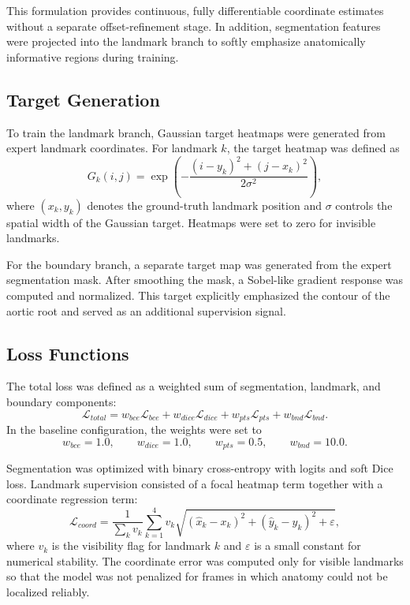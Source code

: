\documentclass[utf8]{FrontiersinHarvard}
\begin{document}
This formulation provides continuous, fully differentiable coordinate estimates without a separate offset-refinement stage. In addition, segmentation 
features were projected into the landmark branch to softly emphasize anatomically informative regions during training.

\subsection{Target Generation}

To train the landmark branch, Gaussian target heatmaps were generated from expert landmark coordinates. For landmark $k$, the target heatmap was defined as
\begin{equation}
G_k(i,j)=
\exp\left(
-\frac{(i-y_k)^2+(j-x_k)^2}{2\sigma^2}
\right),
\end{equation}
where $(x_k,y_k)$ denotes the ground-truth landmark position and $\sigma$ controls the spatial width of the Gaussian target. Heatmaps were set 
to zero for invisible landmarks.

For the boundary branch, a separate target map was generated from the expert segmentation mask. After smoothing the mask, a Sobel-like gradient 
response was computed and normalized. This target explicitly emphasized the contour of the aortic root and served as an additional supervision signal.

\subsection{Loss Functions}

The total loss was defined as a weighted sum of segmentation, landmark, and boundary components:
\begin{equation}
\mathcal{L}_{total} =
w_{bce}\mathcal{L}_{bce} +
w_{dice}\mathcal{L}_{dice} +
w_{pts}\mathcal{L}_{pts} +
w_{bnd}\mathcal{L}_{bnd}.
\end{equation}
In the baseline configuration, the weights were set to
\begin{equation}
w_{bce}=1.0,\qquad
w_{dice}=1.0,\qquad
w_{pts}=0.5,\qquad
w_{bnd}=10.0.
\end{equation}

Segmentation was optimized with binary cross-entropy with logits and soft Dice loss. Landmark supervision consisted of a focal heatmap term 
together with a coordinate regression term:
\begin{equation}
\mathcal{L}_{coord} =
\frac{1}{\sum_k v_k}
\sum_{k=1}^{4}
v_k
\sqrt{
(\hat{x}_k-x_k)^2+(\hat{y}_k-y_k)^2+\varepsilon
},
\end{equation}
where $v_k$ is the visibility flag for landmark $k$ and $\varepsilon$ is a small constant for numerical stability. The coordinate error was 
computed only for visible landmarks so that the model was not penalized for frames in which anatomy could not be localized reliably.
\end{document}

